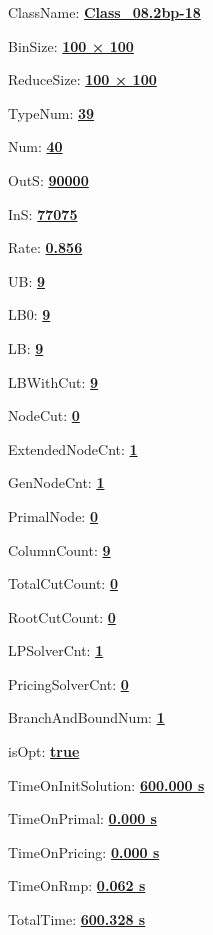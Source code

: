 \documentclass[11pt]{article}
\begin{document}
\pagestyle{empty}


ClassName: \underline{\textbf{Class_08.2bp-18}}
\par
BinSize: \underline{\textbf{100 × 100}}
\par
ReduceSize: \underline{\textbf{100 × 100}}
\par
TypeNum: \underline{\textbf{39}}
\par
Num: \underline{\textbf{40}}
\par
OutS: \underline{\textbf{90000}}
\par
InS: \underline{\textbf{77075}}
\par
Rate: \underline{\textbf{0.856}}
\par
UB: \underline{\textbf{9}}
\par
LB0: \underline{\textbf{9}}
\par
LB: \underline{\textbf{9}}
\par
LBWithCut: \underline{\textbf{9}}
\par
NodeCut: \underline{\textbf{0}}
\par
ExtendedNodeCnt: \underline{\textbf{1}}
\par
GenNodeCnt: \underline{\textbf{1}}
\par
PrimalNode: \underline{\textbf{0}}
\par
ColumnCount: \underline{\textbf{9}}
\par
TotalCutCount: \underline{\textbf{0}}
\par
RootCutCount: \underline{\textbf{0}}
\par
LPSolverCnt: \underline{\textbf{1}}
\par
PricingSolverCnt: \underline{\textbf{0}}
\par
BranchAndBoundNum: \underline{\textbf{1}}
\par
isOpt: \underline{\textbf{true}}
\par
TimeOnInitSolution: \underline{\textbf{600.000 s}}
\par
TimeOnPrimal: \underline{\textbf{0.000 s}}
\par
TimeOnPricing: \underline{\textbf{0.000 s}}
\par
TimeOnRmp: \underline{\textbf{0.062 s}}
\par
TotalTime: \underline{\textbf{600.328 s}}
\par
\newpage


\end{document}
